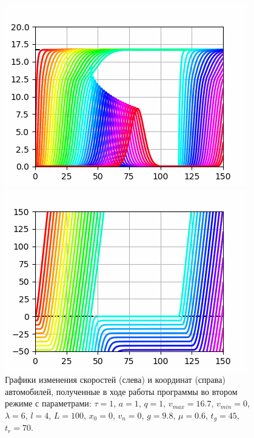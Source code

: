 \documentclass[12pt, a4paper]{extarticle}
\numberwithin{equation}{section}
\numberwithin{figure}{section}
\begin{document}
\begin{figure}[h!]
	\begin{center}
		\begin{minipage}[h]{0.48\linewidth}
			\includegraphics[width=1\linewidth]
			{Im/second_mode_speed}
		\end{minipage}
		\hfill 
		\begin{minipage}[h]{0.48\linewidth}
			\includegraphics[width=1\linewidth]
			{Im/second_mode_distance}
		\end{minipage}
	\caption{Графики изменения скоростей (слева) и координат (справа) автомобилей, полученные в ходе работы программы во втором режиме с параметрами: $\tau=1$, $a=1$, $q=1$, $v_{max}=16.7$, $v_{min}=0$, $\lambda=6$, $l=4$, $L=100$, $x_0=0$, $v_n=0$, $g=9.8$, $\mu=0.6$, $t_g=45$, $t_r=70$. }
	\label{second_mode}
	\end{center}
\end{figure}
\end{document}
